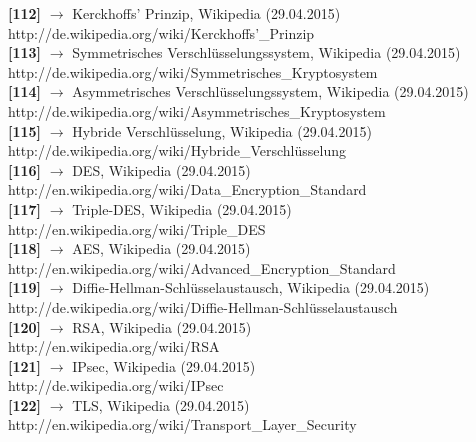 \documentclass[12pt,a4paper]{report}
\begin{document}
\begin{onehalfspace}
\noindent
\textbf{[112]} $\rightarrow$ Kerckhoffs' Prinzip, Wikipedia (29.04.2015)\\
http://de.wikipedia.org/wiki/Kerckhoffs'\_Prinzip\\

\noindent
\textbf{[113]} $\rightarrow$ Symmetrisches Verschlüsselungssystem, Wikipedia (29.04.2015)\\
http://de.wikipedia.org/wiki/Symmetrisches\_Kryptosystem\\

\noindent
\textbf{[114]} $\rightarrow$ Asymmetrisches Verschlüsselungssystem, Wikipedia (29.04.2015)\\
http://de.wikipedia.org/wiki/Asymmetrisches\_Kryptosystem\\

\noindent
\textbf{[115]} $\rightarrow$ Hybride Verschlüsselung, Wikipedia (29.04.2015)\\
http://de.wikipedia.org/wiki/Hybride\_Verschlüsselung\\

\noindent
\textbf{[116]} $\rightarrow$ DES, Wikipedia (29.04.2015)\\
http://en.wikipedia.org/wiki/Data\_Encryption\_Standard\\

\noindent
\textbf{[117]} $\rightarrow$ Triple-DES, Wikipedia (29.04.2015)\\
http://en.wikipedia.org/wiki/Triple\_DES\\

\noindent
\textbf{[118]} $\rightarrow$ AES, Wikipedia (29.04.2015)\\
http://en.wikipedia.org/wiki/Advanced\_Encryption\_Standard\\

\noindent
\textbf{[119]} $\rightarrow$ Diffie-Hellman-Schlüsselaustausch, Wikipedia (29.04.2015)\\
http://de.wikipedia.org/wiki/Diffie-Hellman-Schlüsselaustausch\\

\noindent
\textbf{[120]} $\rightarrow$ RSA, Wikipedia (29.04.2015)\\
http://en.wikipedia.org/wiki/RSA\\

\noindent
\textbf{[121]} $\rightarrow$ IPsec, Wikipedia (29.04.2015)\\
http://de.wikipedia.org/wiki/IPsec\\

\noindent
\textbf{[122]} $\rightarrow$ TLS, Wikipedia (29.04.2015)\\
http://en.wikipedia.org/wiki/Transport\_Layer\_Security\\


\end{onehalfspace}
\end{document}
